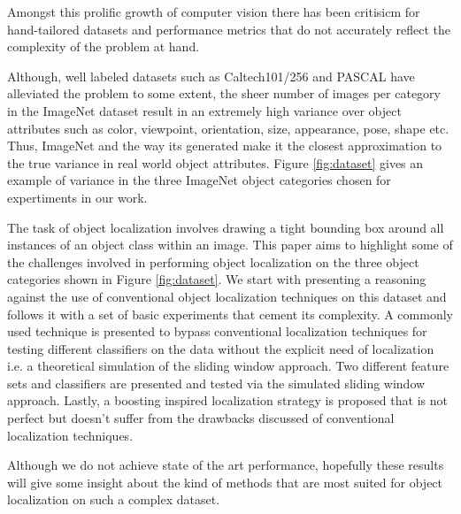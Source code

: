 \documentclass[10pt,twocolumn,letterpaper]{article}
\begin{document}
Amongst this prolific growth of computer vision there has been
critisicm for hand-tailored datasets and performance metrics that do not accurately 
reflect the complexity of the problem at hand.

Although, well labeled datasets such as Caltech101/256 \cite{dataset2,dataset3} and PASCAL
\cite{dataset1} have alleviated the problem to some extent, the sheer number of images
per category in the ImageNet \cite{dataset4} dataset result in an extremely high
variance over object attributes such as color, viewpoint, orientation, size, appearance, pose,
shape etc. Thus, ImageNet and the way its generated make it the closest approximation
to the true variance in real world object attributes. Figure \ref{fig:dataset} gives an
example of variance in the three ImageNet object categories chosen for expertiments
in our work.

The task of object localization involves drawing a tight bounding box around all instances
of an object class within an image. This paper aims to highlight some of the challenges involved in performing object 
localization on the three object categories shown in Figure \ref{fig:dataset}. We start with presenting a reasoning against the use
of conventional object localization techniques on this dataset and follows it with a set of basic
experiments that cement its complexity. A commonly used technique is presented to bypass conventional localization
techniques for testing different classifiers on the data without the explicit need of localization i.e. a 
theoretical simulation of the sliding window approach. Two different feature sets and classifiers are presented and tested
via the simulated sliding window approach. Lastly, a boosting inspired localization strategy is proposed that 
is not perfect but doesn't suffer from the drawbacks discussed of conventional localization techniques.

Although we do not achieve state of the art performance, hopefully these results will give some insight about the kind of 
methods that are most suited for object localization on such a complex dataset.
\end{document}
